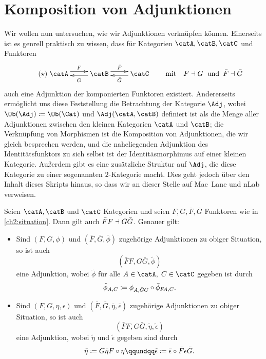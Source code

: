 \chapter{Komposition von Adjunktionen}
Wir wollen nun untersuchen, wie wir Adjunktionen verknüpfen können. Einerseits
ist es genrell praktisch zu wissen, dass für Kategorien $\catA,\catB,\catC$ und
Funktoren
\vspace{-1mm}
\[ \tag{$\star$} \label{ch2:situation}
    \xymatrix{ \catA \ar@<3.5pt>[r]^F & \ar@<2pt>[l]^{G\vphantom{\bar G}} \catB 
    \ar@<3.5pt>[r]^{\bar F} & \ar@<2pt>[l]^{\bar G} \catC
    }
    \qquad\text{mit}\quad 
    F\leftadjoint G \text{\; und \,} \bar F\leftadjoint\bar G
\]
auch eine Adjunktion der komponierten Funktoren existiert. Andererseits
ermöglicht uns diese Feststellung die Betrachtung der Kategorie $\Adj$, wobei
$\Ob(\Adj)\defeq\Ob(\Cat)$ und $\Adj(\catA,\catB)$ definiert ist als die 
Menge aller Adjunktionen %
zwischen den kleinen Kategorien $\catA$ und $\catB$;
die Verknüpfung von Morphismen ist die Komposition von Adjunktionen, die wir 
gleich besprechen werden, und die naheliegenden Adjunktion des
Identitätsfunktors zu sich selbst ist der Identitäsmorphimus auf einer kleinen
Kategorie. Außerdem gibt es eine zusätzliche Struktur auf $\Adj$, die diese
Kategorie zu einer sogenannten $2$-Kategorie macht. Dies geht jedoch über den
Inhalt dieses Skripts hinaus, so dass wir an dieser Stelle auf 
Mac~Lane\cite[\S\,IV.8,\;\S\,XII.3]{bookc:maclane97} und 
nLab\cite{www:nlab:2category} verweisen.

\begin{thProposition}
    \label{ch2:kompos}
    Seien $\catA,\catB$ und $\catC$ Kategorien und seien $F,G,\bar F,\bar G$
    Funktoren wie in \eqref{ch2:situation}.
    Dann gilt auch $\bar F F \dashv G\bar G$.
    Genauer gilt:
    \begin{itemize}
        \item
            Sind $(F,G,\phi)$ und $(\bar F,\bar G,\bar\phi)$ zugehörige
            Adjunktionen zu obiger Situation, so ist auch
            \[ (\bar F F, G\bar G, \tilde\phi) \]  
            eine Adjunktion, wobei $\tilde\phi$ für alle 
            $A\in\catA,\; C\in\catC$ gegeben ist durch
            \[ \tilde\phi_{A,C} \defeq 
                \phi_{A,\bar GC} \after \bar\phi_{F\!A,C}
            . \]

        \item
            Sind $(F,G,\eta,\epsilon)$ und $(\bar F, \bar G, \bar\eta,
            \bar\epsilon)$ zugehörige Adjunktionen zu obiger Situation, so ist
            auch
            \[ (\bar F F, G\bar G, \tilde\eta, \tilde\epsilon) \]
            eine Adjunktion, wobei $\tilde\eta$ und $\tilde\epsilon$ gegeben
            sind durch
            \[ \tilde\eta \defeq G\bar\eta F \after \eta
                \qqundqq
                \tilde\epsilon \defeq \bar\epsilon \after \bar F\epsilon \bar G
            . \]
    \end{itemize}
\end{thProposition}

